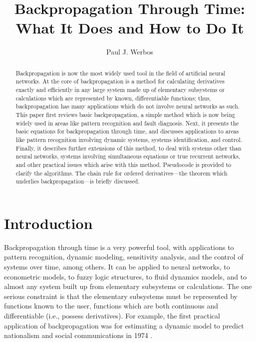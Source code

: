 \documentclass[journal]{IEEEtran} %
\title{Backpropagation Through Time: What It Does and How to Do It}
\author{Paul J. Werbos}
\begin{document}
\maketitle

\begin{abstract}
Backpropagation is now the most widely used tool in the field of artificial neural networks. At the core of backpropagation is a method for calculating derivatives exactly and efficiently in any large system made up of elementary subsystems or calculations which are represented by known, differentiable functions; thus, backpropagation has many applications which do not involve neural networks as such. This paper first reviews basic backpropagation, a simple method which is now being widely used in areas like pattern recognition and fault diagnosis. Next, it presents the basic equations for backpropagation through time, and discusses applications to areas like pattern recognition involving dynamic systems, systems identification, and control. Finally, it describes further extensions of this method, to deal with systems other than neural networks, systems involving simultaneous equations or true recurrent networks, and other practical issues which arise with this method. Pseudocode is provided to clarify the algorithms. The chain rule for ordered derivatives---the theorem which underlies backpropagation---is briefly discussed.
\end{abstract}


\section{Introduction}
Backpropagation through time is a very powerful tool, with applications to pattern recognition, dynamic modeling, sensitivity analysis, and the control of systems over time, among others. It can be applied to neural networks, to econometric models, to fuzzy logic structures, to fluid dynamics models, and to almost any system built up from elementary subsystems or calculations. The one serious constraint is that the elementary subsystems must be represented by functions known to the user, functions which are both continuous and differentiable (i.e., possess derivatives). For example, the first practical application of backpropagation was for estimating a dynamic model to predict nationalism and social communications in 1974 \cite{Werbos:1974}.
\end{document}
